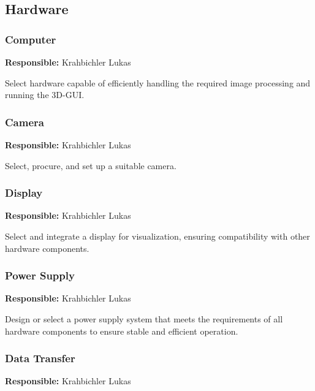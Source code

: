 \subsection{Hardware}

\subsubsection{Computer}

\textbf{Responsible:} Krahbichler Lukas

Select hardware capable of efficiently handling the required image processing and running the 3D-GUI.

\subsubsection{Camera} %

\textbf{Responsible:} Krahbichler Lukas

Select, procure, and set up a suitable camera.

\subsubsection{Display} %

\textbf{Responsible:} Krahbichler Lukas

Select and integrate a display for visualization, ensuring compatibility with other hardware components.

\subsubsection{Power Supply}

\textbf{Responsible:} Krahbichler Lukas

Design or select a power supply system that meets the requirements of all hardware components to ensure stable and efficient operation.

\subsubsection{Data Transfer}

\textbf{Responsible:} Krahbichler Lukas

